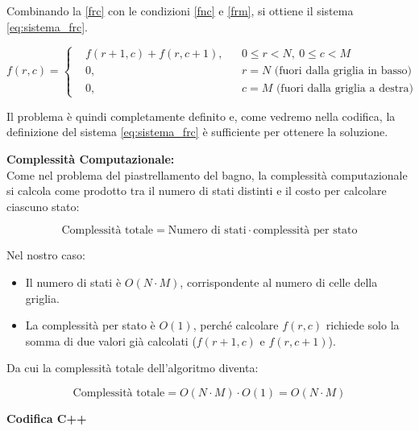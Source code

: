 Combinando la \eqref{frc} con le condizioni \eqref{fnc} e \eqref{frm}, si ottiene il sistema \eqref{eq:sistema_frc}.

\begin{equation}
	f(r,c) =
	\left\{
	\begin{aligned}
		& f(r+1, c) + f(r, c+1), && 0 \le r < N, \ 0 \le c < M\\
		& 0, && r = N \text{ (fuori dalla griglia in basso)}\\
		& 0, && c = M \text{ (fuori dalla griglia a destra)}
	\end{aligned}
	\right.
	\label{eq:sistema_frc}
\end{equation}


Il problema è quindi completamente definito e, come vedremo nella codifica, la definizione del sistema \eqref{eq:sistema_frc} è sufficiente per ottenere la soluzione.

\bigskip

\noindent \textbf{Complessità Computazionale:}\\
Come nel problema del piastrellamento del bagno, la complessità computazionale si calcola come prodotto tra il numero di stati distinti e il costo per calcolare ciascuno stato:

\begin{equation}
	\text{Complessità totale} = \text{Numero di stati} \cdot \text{complessità per stato} 
	\label{eq:complessità}
\end{equation}

Nel nostro caso:

\begin{itemize}
	\item Il numero di stati è \(O(N \cdot M)\), corrispondente al numero di celle della griglia.  
	\item La complessità per stato è \(O(1)\), perché calcolare \(f(r,c)\) richiede solo la somma di due valori già calcolati (\(f(r+1,c)\) e \(f(r,c+1)\)).  
\end{itemize}

Da cui la complessità totale dell’algoritmo diventa:

\begin{equation}
	\text{Complessità totale} = O(N \cdot M) \cdot O(1) = O(N \cdot M)
\end{equation}

\bigskip
\noindent \textbf{Codifica C++} \\


